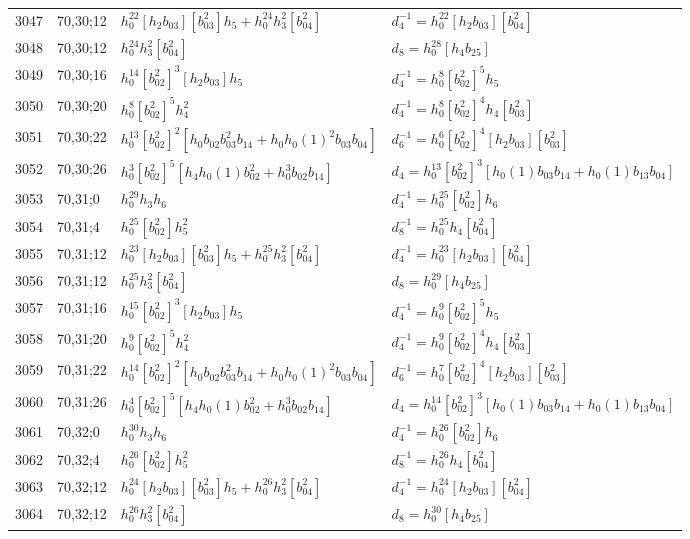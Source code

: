 \documentclass{article}
\begin{document}
\begin{longtable}{|l|l|>{\raggedright\arraybackslash}p{6cm}|>{\raggedright\arraybackslash}p{6cm}|}
\hline
3047 & 70,30;12 & $h_0^{22}[h_2b_{03}][b_{03}^2]h_5 + h_0^{24}h_3^2[b_{04}^2]$ & $d_{4}^{-1}=h_0^{22}[h_2b_{03}][b_{04}^2]$\\
3048 & 70,30;12 & $h_0^{24}h_3^2[b_{04}^2]$ &$d_{8}=h_0^{28}[h_4b_{25}]$\\
\hline
3049 & 70,30;16 & $h_0^{14}[b_{02}^2]^3[h_2b_{03}]h_5$ & $d_{4}^{-1}=h_0^8[b_{02}^2]^5h_5$\\
\hline
3050 & 70,30;20 & $h_0^8[b_{02}^2]^5h_4^2$ & $d_{4}^{-1}=h_0^8[b_{02}^2]^4h_4[b_{03}^2]$\\
\hline
3051 & 70,30;22 & $h_0^{13}[b_{02}^2]^2[h_0b_{02}b_{03}^2b_{14} + h_0h_0(1)^2b_{03}b_{04}]$ & $d_{6}^{-1}=h_0^6[b_{02}^2]^4[h_2b_{03}][b_{03}^2]$\\
\hline
3052 & 70,30;26 & $h_0^3[b_{02}^2]^5[h_4h_0(1)b_{02}^2 + h_0^3b_{02}b_{14}]$ &$d_{4}=h_0^{13}[b_{02}^2]^3[h_0(1)b_{03}b_{14} + h_0(1)b_{13}b_{04}]$\\
\hline
3053 & 70,31;0 & $h_0^{29}h_3h_6$ & $d_{4}^{-1}=h_0^{25}[b_{02}^2]h_6$\\
\hline
3054 & 70,31;4 & $h_0^{25}[b_{02}^2]h_5^2$ & $d_{8}^{-1}=h_0^{25}h_4[b_{04}^2]$\\
\hline
3055 & 70,31;12 & $h_0^{23}[h_2b_{03}][b_{03}^2]h_5 + h_0^{25}h_3^2[b_{04}^2]$ & $d_{4}^{-1}=h_0^{23}[h_2b_{03}][b_{04}^2]$\\
3056 & 70,31;12 & $h_0^{25}h_3^2[b_{04}^2]$ &$d_{8}=h_0^{29}[h_4b_{25}]$\\
\hline
3057 & 70,31;16 & $h_0^{15}[b_{02}^2]^3[h_2b_{03}]h_5$ & $d_{4}^{-1}=h_0^9[b_{02}^2]^5h_5$\\
\hline
3058 & 70,31;20 & $h_0^9[b_{02}^2]^5h_4^2$ & $d_{4}^{-1}=h_0^9[b_{02}^2]^4h_4[b_{03}^2]$\\
\hline
3059 & 70,31;22 & $h_0^{14}[b_{02}^2]^2[h_0b_{02}b_{03}^2b_{14} + h_0h_0(1)^2b_{03}b_{04}]$ & $d_{6}^{-1}=h_0^7[b_{02}^2]^4[h_2b_{03}][b_{03}^2]$\\
\hline
3060 & 70,31;26 & $h_0^4[b_{02}^2]^5[h_4h_0(1)b_{02}^2 + h_0^3b_{02}b_{14}]$ &$d_{4}=h_0^{14}[b_{02}^2]^3[h_0(1)b_{03}b_{14} + h_0(1)b_{13}b_{04}]$\\
\hline
3061 & 70,32;0 & $h_0^{30}h_3h_6$ & $d_{4}^{-1}=h_0^{26}[b_{02}^2]h_6$\\
\hline
3062 & 70,32;4 & $h_0^{26}[b_{02}^2]h_5^2$ & $d_{8}^{-1}=h_0^{26}h_4[b_{04}^2]$\\
\hline
3063 & 70,32;12 & $h_0^{24}[h_2b_{03}][b_{03}^2]h_5 + h_0^{26}h_3^2[b_{04}^2]$ & $d_{4}^{-1}=h_0^{24}[h_2b_{03}][b_{04}^2]$\\
3064 & 70,32;12 & $h_0^{26}h_3^2[b_{04}^2]$ &$d_{8}=h_0^{30}[h_4b_{25}]$\\

\end{longtable}
\end{document}
